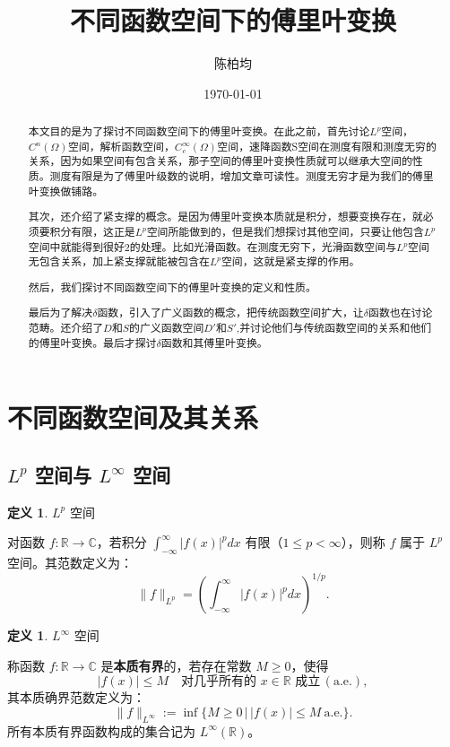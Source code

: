 \documentclass[12pt,a4paper]{article}
\title{不同函数空间下的傅里叶变换}
\author{陈柏均}
\date{\today}
\theoremstyle{plain}
\theoremstyle{definition}
\newtheorem{definition}[theorem]{定义}
\theoremstyle{remark}
\begin{document}
	\maketitle
		\begin{abstract}
		本文目的是为了探讨不同函数空间下的傅里叶变换。在此之前，首先讨论$L^p$空间，$C^n(\Omega)$空间，解析函数空间，$C_c^\infty(\Omega)$空间，速降函数S空间在测度有限和测度无穷的关系，因为如果空间有包含关系，那子空间的傅里叶变换性质就可以继承大空间的性质。测度有限是为了傅里叶级数的说明，增加文章可读性。测度无穷才是为我们的傅里叶变换做铺路。
		
		其次，还介绍了紧支撑的概念。是因为傅里叶变换本质就是积分，想要变换存在，就必须要积分有限，这正是$L^p$空间所能做到的，但是我们想探讨其他空间，只要让他包含$L^p$空间中就能得到很好2的处理。比如光滑函数。在测度无穷下，光滑函数空间与$L^p$空间无包含关系，加上紧支撑就能被包含在$L^p$空间，这就是紧支撑的作用。
		
		然后，我们探讨不同函数空间下的傅里叶变换的定义和性质。
		
	    最后为了解决$\delta$函数，引入了广义函数的概念，把传统函数空间扩大，让$\delta$函数也在讨论范畴。还介绍了$D$和$S$的广义函数空间$D'$和$S'$,并讨论他们与传统函数空间的关系和他们的傅里叶变换。最后才探讨$\delta$函数和其傅里叶变换。
	\end{abstract}
	\newpage
	
		\tableofcontents
	\clearpage
	
	
	\section{不同函数空间及其关系}
	\subsection{\texorpdfstring{$L^p$}{Lp} 空间与 \texorpdfstring{$L^\infty$}{L∞} 空间}
	
	\begin{definition}$L^p$ 空间
		
		对函数 $f: \mathbb{R} \to \mathbb{C}$，若积分 $\int_{-\infty}^\infty |f(x)|^p dx$ 有限（$1 \leq p < \infty$），则称 $f$ 属于 $L^p$ 空间。其范数定义为：
		\[
		\|f\|_{L^p} = \left( \int_{-\infty}^\infty |f(x)|^p dx \right)^{1/p}.
		\]
	\end{definition}
	
\begin{definition}$L^\infty$ 空间
	
	称函数 $f: \mathbb{R} \to \mathbb{C}$ 是\textbf{本质有界}的，若存在常数 $M \geq 0$，使得
	\[
	|f(x)| \leq M \quad \text{对几乎所有的 } x \in \mathbb{R} \text{ 成立} \, (\text{a.e.}),
	\]
	其本质确界范数定义为：
	\[
	\|f\|_{L^\infty} := \inf \big\{ M \geq 0 \,\big|\, |f(x)| \leq M \ \text{a.e.} \big\}.
	\]
	所有本质有界函数构成的集合记为 $L^\infty(\mathbb{R})$。
\end{definition}
	
\end{document}
